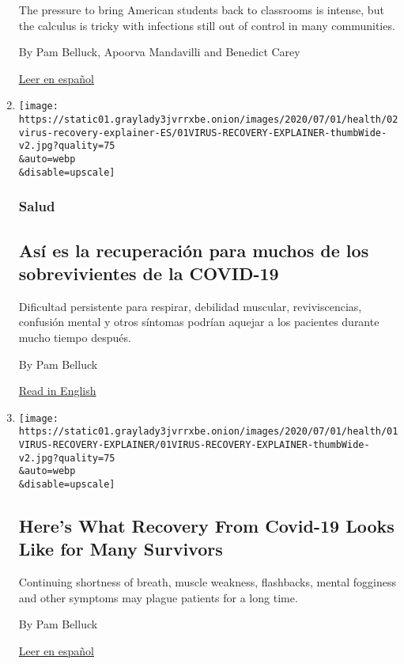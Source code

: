 \begin{enumerate}
  The pressure to bring American students back to classrooms is intense,
  but the calculus is tricky with infections still out of control in
  many communities.

  By Pam Belluck, Apoorva Mandavilli and Benedict Carey

  \href{https://www.nytimes3xbfgragh.onion/es/2020/07/27/espanol/ciencia-y-tecnologia/regreso-a-clases-coronavirus.html}{Leer
  en español}
\item
  \href{/es/2020/07/02/espanol/ciencia-y-tecnologia/sobrevivientes-coronavirus-recuperacion.html}{}

  \texttt{[image: https://static01.graylady3jvrrxbe.onion/images/2020/07/01/health/02virus-recovery-explainer-ES/01VIRUS-RECOVERY-EXPLAINER-thumbWide-v2.jpg?quality=75\\\&auto=webp\\\&disable=upscale]}

  \hypertarget{salud}{%
  \subsubsection{Salud}\label{salud}}

  \hypertarget{asuxed-es-la-recuperaciuxf3n-para-muchos-de-los-sobrevivientes-de-la-covid-19}{%
  \subsection{Así es la recuperación para muchos de los sobrevivientes
  de la
  COVID-19}\label{asuxed-es-la-recuperaciuxf3n-para-muchos-de-los-sobrevivientes-de-la-covid-19}}

  Dificultad persistente para respirar, debilidad muscular,
  reviviscencias, confusión mental y otros síntomas podrían aquejar a
  los pacientes durante mucho tiempo después.

  By Pam Belluck

  \href{https://www.nytimes3xbfgragh.onion/2020/07/01/health/coronavirus-recovery-survivors.html}{Read
  in English}
\item
  \href{/2020/07/01/health/coronavirus-recovery-survivors.html}{}

  \texttt{[image: https://static01.graylady3jvrrxbe.onion/images/2020/07/01/health/01VIRUS-RECOVERY-EXPLAINER/01VIRUS-RECOVERY-EXPLAINER-thumbWide-v2.jpg?quality=75\\\&auto=webp\\\&disable=upscale]}

  \hypertarget{heres-what-recovery-from-covid-19-looks-like-for-many-survivors}{%
  \subsection{Here's What Recovery From Covid-19 Looks Like for Many
  Survivors}\label{heres-what-recovery-from-covid-19-looks-like-for-many-survivors}}

  Continuing shortness of breath, muscle weakness, flashbacks, mental
  fogginess and other symptoms may plague patients for a long time.

  By Pam Belluck

  \href{https://www.nytimes3xbfgragh.onion/es/2020/07/02/espanol/ciencia-y-tecnologia/sobrevivientes-coronavirus-recuperacion.html}{Leer
  en español}
\end{enumerate}


